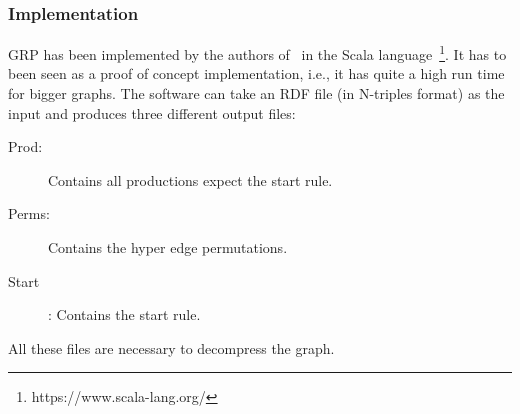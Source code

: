 \subsubsection{Implementation}\label{sec:relatedworkGRPImpl}

GRP has been implemented by the authors of~\cite{maneth} in the Scala language~\footnote{https://www.scala-lang.org/}. It has to been seen as a proof of concept implementation, i.e., it has quite a high run time for bigger graphs. The software can take an RDF file (in N-triples format) as the input and produces three different output files:

\begin{description}
	\item [Prod:] Contains all productions expect the start rule.
	\item [Perms:] Contains the hyper edge permutations.
	\item [Start]: Contains the start rule.
\end{description} 

All these files are necessary to decompress the graph.














